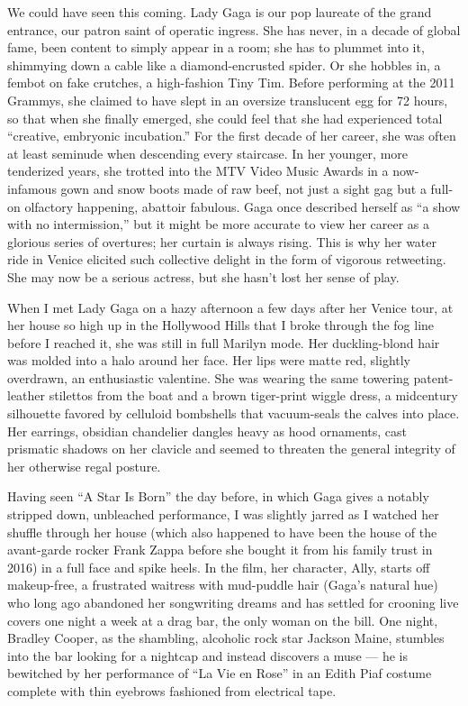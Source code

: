 We could have seen this coming. Lady Gaga is our pop laureate of the
grand entrance, our patron saint of operatic ingress. She has never, in
a decade of global fame, been content to simply appear in a room; she
has to plummet into it, shimmying down a cable like a diamond-encrusted
spider. Or she hobbles in, a fembot on fake crutches, a high-fashion
Tiny Tim. Before performing at the 2011 Grammys, she claimed to have
slept in an oversize translucent egg for 72 hours, so that when she
finally emerged, she could feel that she had experienced total
``creative, embryonic incubation.'' For the first decade of her career,
she was often at least seminude when descending every staircase. In her
younger, more tenderized years, she trotted into the MTV Video Music
Awards in a now-infamous gown and snow boots made of raw beef, not just
a sight gag but a full-on olfactory happening, abattoir fabulous. Gaga
once described herself as ``a show with no intermission,'' but it might
be more accurate to view her career as a glorious series of overtures;
her curtain is always rising. This is why her water ride in Venice
elicited such collective delight in the form of vigorous retweeting. She
may now be a serious actress, but she hasn't lost her sense of play.

When I met Lady Gaga on a hazy afternoon a few days after her Venice
tour, at her house so high up in the Hollywood Hills that I broke
through the fog line before I reached it, she was still in full Marilyn
mode. Her duckling-blond hair was molded into a halo around her face.
Her lips were matte red, slightly overdrawn, an enthusiastic valentine.
She was wearing the same towering patent-leather stilettos from the boat
and a brown tiger-print wiggle dress, a midcentury silhouette favored by
celluloid bombshells that vacuum-seals the calves into place. Her
earrings, obsidian chandelier dangles heavy as hood ornaments, cast
prismatic shadows on her clavicle and seemed to threaten the general
integrity of her otherwise regal posture.

Having seen ``A Star Is Born'' the day before, in which Gaga gives a
notably stripped down, unbleached performance, I was slightly jarred as
I watched her shuffle through her house (which also happened to have
been the house of the avant-garde rocker Frank Zappa before she bought
it from his family trust in 2016) in a full face and spike heels. In the
film, her character, Ally, starts off makeup-free, a frustrated waitress
with mud-puddle hair (Gaga's natural hue) who long ago abandoned her
songwriting dreams and has settled for crooning live covers one night a
week at a drag bar, the only woman on the bill. One night, Bradley
Cooper, as the shambling, alcoholic rock star Jackson Maine, stumbles
into the bar looking for a nightcap and instead discovers a muse --- he
is bewitched by her performance of ``La Vie en Rose'' in an Edith Piaf
costume complete with thin eyebrows fashioned from electrical tape.

